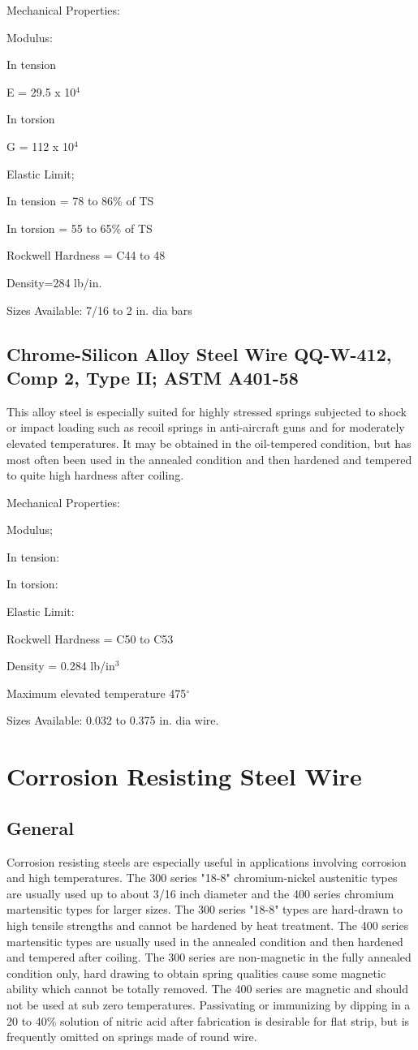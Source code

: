 \documentclass[10pt]{article}
\begin{document}
Mechanical Properties:

Modulus:

In tension

E = 29.5 x 10$^4$

In torsion

G = 112 x 10$^4$

Elastic Limit;

In tension = 78 to 86\% of TS

In torsion = 55 to 65\% of TS

Rockwell Hardness = C44 to 48

Density=284 lb/in.

Sizes Available: 7/16 to 2 in. dia bars

\subsection{Chrome-Silicon Alloy Steel Wire QQ-W-412, Comp 2, Type II; ASTM A401-58} %
This alloy steel is especially suited for highly stressed springs subjected to shock or impact loading such as recoil springs in anti-aircraft guns and for moderately elevated temperatures. 
It may be obtained in the oil-tempered condition, but has most often been used in the annealed condition and then hardened and tempered to quite high hardness after coiling.

Mechanical Properties:

Modulus;

In tension:

In torsion:

Elastic Limit:

Rockwell Hardness = C50 to C53

Density = 0.284 lb/in$^3$

Maximum elevated temperature 475$^\circ$

Sizes Available: 0.032 to 0.375 in. dia wire.

\clearpage
\section{Corrosion Resisting Steel Wire} %
\subsection{General} %
Corrosion resisting steels are especially useful in applications involving corrosion and high temperatures.
The 300 series "18-8" chromium-nickel austenitic types are usually used up to about 3/16 inch diameter and the 400 series chromium martensitic types for larger sizes. 
The 300 series "18-8" types are hard-drawn to high tensile strengths and cannot be hardened by heat treatment.
The 400 series martensitic types are usually used in the annealed condition and then hardened and tempered after coiling.
The 300 series are non-magnetic in the fully annealed condition only, hard drawing to obtain spring qualities cause some magnetic ability which cannot be totally removed. 
The 400 series are magnetic and should not be used at sub zero temperatures.
Passivating or immunizing by dipping in a 20 to 40\% solution of nitric acid after fabrication is desirable for flat strip, but is frequently omitted on springs made of round wire.
\end{document}
